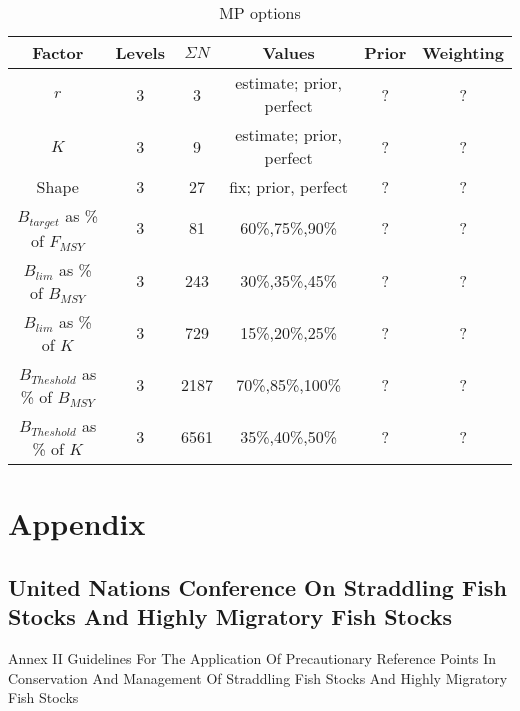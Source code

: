 \documentclass[a4paper,10pt]{article}
\begin{document}
\begin{table}
\begin{center}
\label{tab:datasumm}
\begin{tabular}{|cccccc|}
\hline
{\tiny Factor} & {\tiny Levels} & {\tiny $\Sigma N$} & {\tiny Values} & {\tiny Prior} & {\tiny Weighting}\\
\hline\hline
{\tiny $r$} 	 				& {\tiny 3}  	& {\tiny 3} 	& {\tiny estimate; prior, perfect}	& {\tiny ?}    & {\tiny ?}\\
{\tiny $K$}					& {\tiny 3}  	& {\tiny 9}  	& {\tiny estimate; prior, perfect} 	& {\tiny ?}    & {\tiny ?}\\
{\tiny Shape} 					& {\tiny 3}  	& {\tiny 27} 	& {\tiny fix; prior, perfect}      	& {\tiny ?}    & {\tiny ?}\\
{\tiny $B_{target}$ as \% of $F_{MSY}$} 	& {\tiny 3}  	& {\tiny 81} 	& {\tiny 60\%,75\%,90\%} 		& {\tiny ?}    & {\tiny ?}\\
{\tiny $B_{lim}$ as \% of $B_{MSY}$}		& {\tiny 3}  	& {\tiny 243} 	& {\tiny 30\%,35\%,45\%} 	       	& {\tiny ?}    & {\tiny ?}\\
{\tiny $B_{lim}$ as \% of $K$}			& {\tiny 3}  	& {\tiny 729} 	& {\tiny 15\%,20\%,25\%}         	& {\tiny ?}    & {\tiny ?}\\
{\tiny $B_{Theshold}$ as \% of $B_{MSY}$}	& {\tiny 3}  	& {\tiny 2187} 	& {\tiny 70\%,85\%,100\%} 		& {\tiny ?}    & {\tiny ?}\\
{\tiny $B_{Theshold}$ as \% of $K$}		& {\tiny 3}  	& {\tiny 6561}	& {\tiny 35\%,40\%,50\%} 		& {\tiny ?}    & {\tiny ?}\\
\hline
\end{tabular}
\end{center}
\caption{MP options}
\label{tab:mp}
\end{table}



\newpage\clearpage
\section*{Appendix}

\subsection*{United Nations Conference On Straddling Fish Stocks And Highly Migratory Fish Stocks}


Annex II Guidelines For The Application Of Precautionary Reference Points In Conservation And Management Of Straddling Fish Stocks And Highly Migratory Fish Stocks
\end{document}

